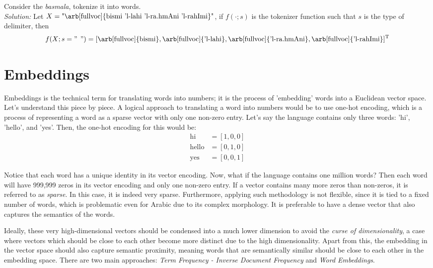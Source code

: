 \begin{exmp}
    Consider the \textit{basmala}, tokenize it into words.\\
    \textit{Solution:} Let $X=\text{"\arb[fullvoc]{bismi 'l-lahi 'l-ra.hmAni 'l-rahImi}"}$, if $f(\cdot;s)$ is the tokenizer function such that $s$ is the type of delimiter, then
    \begin{equation}
        f(X;s="\;\,")=[\text{\arb[fullvoc]{bismi}},\text{\arb[fullvoc]{'l-lahi}},\text{\arb[fullvoc]{'l-ra.hmAni}},\text{\arb[fullvoc]{'l-rahImi}}]^{\text{T}}
    \end{equation}
\end{exmp}

\section{Embeddings}
Embeddings is the technical term for translating words into numbers; it is the process of 'embedding' words into a Euclidean vector space. Let's understand this piece by piece. A logical approach to translating a word into numbers would be to use one-hot encoding, which is a process of representing a word as a sparse vector with only one non-zero entry. Let's say the language contains only three words: 'hi', 'hello', and 'yes'. Then, the one-hot encoding for this would be:
\begin{align}
    \text{hi}&=[1,0,0]\\
    \text{hello}&=[0,1,0]\\
    \text{yes}&=[0,0,1]
\end{align}

Notice that each word has a unique identity in its vector encoding. Now, what if the language contains one million words? Then each word will have 999,999 zeros in its vector encoding and only one non-zero entry. If a vector contains many more zeros than non-zeros, it is referred to as \textit{sparse}. In this case, it is indeed very sparse. Furthermore, applying such methodology is not flexible, since it is tied to a fixed number of words, which is problematic even for Arabic due to its complex morphology. It is preferable to have a dense vector that also captures the semantics of the words.

Ideally, these very high-dimensional vectors should be condensed into a much lower dimension to avoid the \textit{curse of dimensionality}, a case where vectors which should be close to each other become more distinct due to the high dimensionality. Apart from this, the embedding in the vector space should also capture semantic proximity, meaning words that are semantically similar should be close to each other in the embedding space. There are two main approaches: \textit{Term Frequency - Inverse Document Frequency} and \textit{Word Embeddings}.

